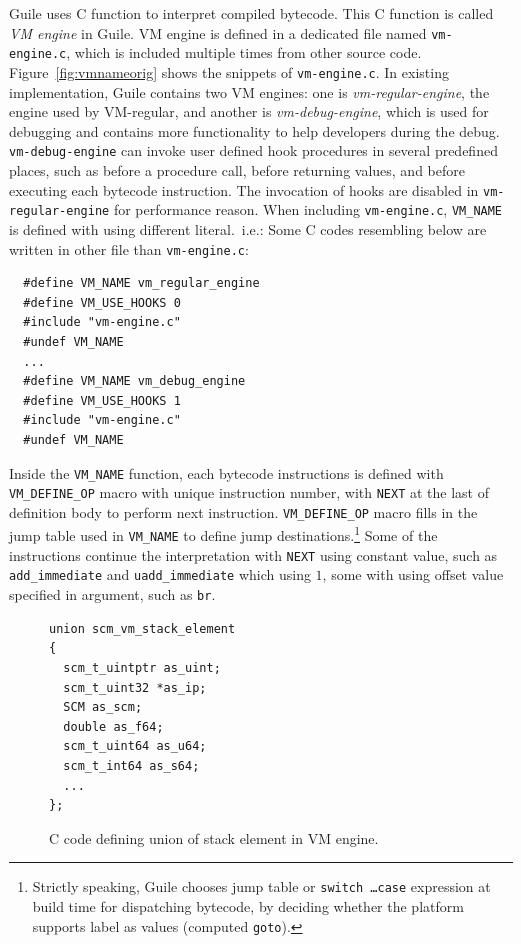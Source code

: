 \documentclass[preprint, 10pt]{sigplanconf}
\begin{document}
Guile uses C function to interpret compiled bytecode. This C function is called
\textit{VM engine} in Guile. VM engine is defined in a dedicated file named
\texttt{vm-engine.c}, which is included multiple times from other source
code. Figure~\hyperref[fig:vmnameorig]{\ref{fig:vmnameorig}} shows the snippets
of \texttt{vm-engine.c}. In existing implementation, Guile contains two VM
engines: one is \textit{vm-regular-engine}, the engine used by VM-regular, and
another is \textit{vm-debug-engine}, which is used for debugging and contains
more functionality to help developers during the debug. \texttt{vm-debug-engine}
can invoke user defined hook procedures in several predefined places, such as
before a procedure call, before returning values, and before executing each
bytecode instruction. The invocation of hooks are disabled in
\texttt{vm-regular-engine} for performance reason. When including
\texttt{vm-engine.c}, \texttt{VM\_NAME} is defined with using different
literal.\ i.e.: Some C codes resembling below are written in other file than
\texttt{vm-engine.c}:

\begin{verbatim}
  #define VM_NAME vm_regular_engine
  #define VM_USE_HOOKS 0
  #include "vm-engine.c"
  #undef VM_NAME
  ...
  #define VM_NAME vm_debug_engine
  #define VM_USE_HOOKS 1
  #include "vm-engine.c"
  #undef VM_NAME
\end{verbatim}

Inside the \texttt{VM\_NAME} function, each bytecode instructions is defined
with \texttt{VM\_DEFINE\_OP} macro with unique instruction number, with
\texttt{NEXT} at the last of definition body to perform next
instruction. \texttt{VM\_DEFINE\_OP} macro fills in the jump table used in
\texttt{VM\_NAME} to define jump destinations.\footnote{Strictly speaking, Guile
  chooses jump table or \texttt{switch \ldots\@ case} expression at build time for
  dispatching bytecode, by deciding whether the platform supports label as
  values (computed \texttt{goto}).}  Some of the instructions continue the
interpretation with \texttt{NEXT} using constant value, such as
\texttt{add\_immediate} and \texttt{uadd\_immediate} which using $1$, some with
using offset value specified in argument, such as \texttt{br}.

\begin{figure}
  \centering
  \small
\begin{verbatim}
union scm_vm_stack_element
{
  scm_t_uintptr as_uint;
  scm_t_uint32 *as_ip;
  SCM as_scm;
  double as_f64;
  scm_t_uint64 as_u64;
  scm_t_int64 as_s64;
  ...
};
\end{verbatim}
\caption{C code defining union of stack element in VM engine.}
\label{fig:stackelem}
\end{figure}
\end{document}
